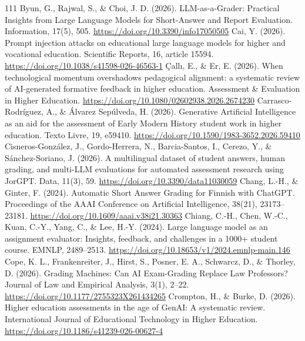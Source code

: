 \begin{thebibliography}{111}
 Byun, G., Rajwal, S., \& Choi, J. D. (2026). LLM-as-a-Grader: Practical Insights from Large Language Models for Short-Answer and Report Evaluation. Information, 17(5), 505. \url{https://doi.org/10.3390/info17050505}
 Cai, Y. (2026). Prompt injection attacks on educational large language models for higher and vocational education. Scientific Reports, 16, article 15594. \url{https://doi.org/10.1038/s41598-026-46563-1}
 \c{C}all\i{}, E., \& Er, E. (2026). When technological momentum overshadows pedagogical alignment: a systematic review of AI-generated formative feedback in higher education. Assessment \& Evaluation in Higher Education. \url{https://doi.org/10.1080/02602938.2026.2674230}
 Carrasco-Rodr\'{i}guez, A., \& \'{A}lvarez Sep\'{u}lveda, H. (2026). Generative Artificial Intelligence as an aid for the assessment of Early Modern History student work in higher education. Texto Livre, 19, e59410. \url{https://doi.org/10.1590/1983-3652.2026.59410}
 Cisneros-Gonz\'{a}lez, J., Gordo-Herrera, N., Barcia-Santos, I., Cerezo, Y., \& S\'{a}nchez-Soriano, J. (2026). A multilingual dataset of student answers, human grading, and multi-LLM evaluations for automated assessment research using JorGPT. Data, 11(3), 59. \url{https://doi.org/10.3390/data11030059}
 Chang, L.-H., \& Ginter, F. (2024). Automatic Short Answer Grading for Finnish with ChatGPT. Proceedings of the AAAI Conference on Artificial Intelligence, 38(21), 23173--23181. \url{https://doi.org/10.1609/aaai.v38i21.30363}
 Chiang, C.-H., Chen, W.-C., Kuan, C.-Y., Yang, C., \& Lee, H.-Y. (2024). Large language model as an assignment evaluator: Insights, feedback, and challenges in a 1000+ student course. EMNLP, 2489--2513. \url{https://doi.org/10.18653/v1/2024.emnlp-main.146}
 Cope, K. L., Frankenreiter, J., Hirst, S., Posner, E. A., Schwarcz, D., \& Thorley, D. (2026). Grading Machines: Can AI Exam-Grading Replace Law Professors? Journal of Law and Empirical Analysis, 3(1), 2--22. \url{https://doi.org/10.1177/2755323X261434265}
 Crompton, H., \& Burke, D. (2026). Higher education assessments in the age of GenAI: A systematic review. International Journal of Educational Technology in Higher Education. \url{https://doi.org/10.1186/s41239-026-00627-4}

\end{thebibliography}
